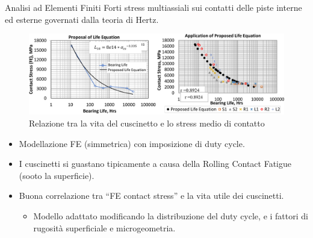 \documentclass{beamer}
\begin{document}
\begin{frame}[allowframebreaks]{Analisi ad Elementi Finiti}
    Forti stress multiassiali sui contatti delle piste interne ed esterne governati dalla teoria di Hertz.

    \begin{figure}
        \centering
        \includegraphics[width=\textwidth]{Figures/FE_Life_Curve.png}
        \caption{Relazione tra la vita del cuscinetto e lo stress medio di contatto}
        \label{fig:FE_Life_Curve}
    \end{figure}

    \framebreak

    \begin{itemize}
        \item Modellazione FE (simmetrica) con imposizione di duty cycle\cite{raju2018bearing}.
        \item I cuscinetti si guastano tipicamente a causa della Rolling Contact Fatigue (sooto la superficie).
        \item Buona correlazione tra ``FE contact stress'' e la vita utile dei cuscinetti.
        \begin{itemize}
            \item Modello adattato modificando la distribuzione del duty cycle, e i fattori di rugosità superficiale e microgeometria.
        \end{itemize}
    \end{itemize}
\end{frame}
\end{document}
